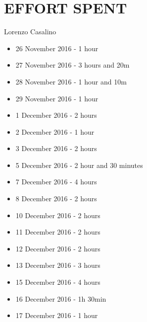 \section{EFFORT SPENT}

	Lorenzo Casalino

	\begin{itemize}
		\item 26 November 2016 - 1 hour
		\item 27 November 2016 - 3 hours and 20m
		\item 28 November 2016 - 1 hour and 10m
		\item 29 November 2016 - 1 hour
		\item 1  December 2016 - 2 hours
		\item 2  December 2016 - 1 hour
		\item 3  December 2016 - 2 hours
		\item 5  December 2016 - 2 hour and 30 minutes
		\item 7  December 2016 - 4 hours
		\item 8  December 2016 - 2 hours
		\item 10 December 2016 - 2 hours
		\item 11 December 2016 - 2 hours
		\item 12 December 2016 - 2 hours
		\item 13 December 2016 - 3 hours
		\item 15 December 2016 - 4 hours
		\item 16 December 2016 - 1h 30min
		\item 17 December 2016 - 1 hour
	\end{itemize}
